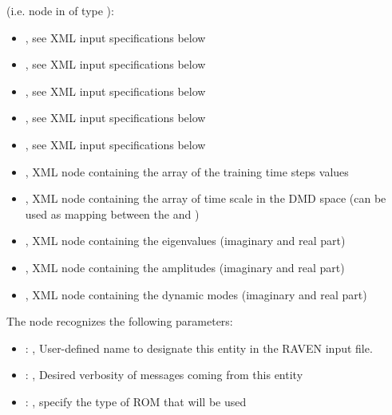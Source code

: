   (i.e.  node     in  of type ):     \begin{itemize}
  \item {}, see XML input specifications below       \item {}, see XML
  input specifications below       \item {}, see XML input specifications below
  \item {}, see XML input specifications below       \item {},
  see XML input specifications below       \item {}, XML node containing the array
  of the training time steps values       \item {}, XML node containing the
  array of time scale in the DMD space (can be used as mapping       between the
   and )       \item {}, XML node containing
  the eigenvalues (imaginary and real part)       \item {}, XML node containing
  the amplitudes (imaginary and real part)       \item {}, XML node containing the
  dynamic modes (imaginary and real part)     \end{itemize}

  The  node recognizes the following parameters:
    \begin{itemize}
      \item {}: ,
        User-defined name to designate this entity in the RAVEN input file.
      \item {}: ,
        Desired verbosity of messages coming from this entity
      \item {}: ,
        specify the type of ROM that will be used
  \end{itemize}

